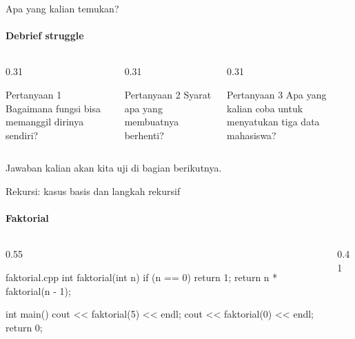 \documentclass[t]{beamer}
\begin{document}
\begin{frame}{Apa yang kalian temukan?}
\framesubtitle{Debrief struggle}
\begin{columns}[T]
\begin{column}{0.31\textwidth}
\begin{BlokGelap}{Pertanyaan 1}
Bagaimana fungsi bisa memanggil dirinya sendiri?
\end{BlokGelap}
\end{column}
\begin{column}{0.31\textwidth}
\begin{BlokGelap}{Pertanyaan 2}
Syarat apa yang membuatnya berhenti?
\end{BlokGelap}
\end{column}
\begin{column}{0.31\textwidth}
\begin{BlokGelap}{Pertanyaan 3}
Apa yang kalian coba untuk menyatukan tiga data mahasiswa?
\end{BlokGelap}
\end{column}
\end{columns}
\vspace{10pt}
Jawaban kalian akan kita uji di bagian berikutnya.
\end{frame}


\begin{frame}[fragile]{Rekursi: kasus basis dan langkah rekursif}
\framesubtitle{Faktorial}
\begin{columns}[T]
\begin{column}{0.55\textwidth}
\begin{Kode}[]{faktorial.cpp}
int faktorial(int n) {
    if (n == 0) return 1;
    return n * faktorial(n - 1);
}

int main() {
    cout << faktorial(5) << endl;
    cout << faktorial(0) << endl;
    return 0;
}
\end{Kode}
\end{column}
\begin{column}{0.41\textwidth}
\end{column}
\end{columns}
\end{frame}
\end{document}
